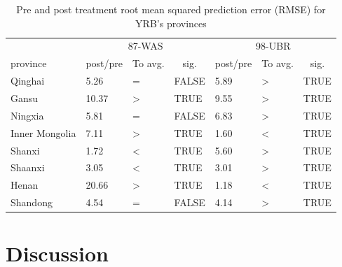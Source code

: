 \documentclass[preprint, 12pt]{elsarticle}
\providecommand{\DIFaddbegin}{} %
\providecommand{\DIFaddend}{} %
\begin{document}
\begin{table}[!htbp]\footnotesize
	\centering
	\caption{Pre and post treatment root mean squared prediction error (RMSE) for YRB's provinces}\label{tab:DSC_summary}
	\begin{tabularx}{0.8\textwidth}{XXXXXXX}
	  \toprule
			& \multicolumn{3}{c}{87-WAS} & \multicolumn{3}{c}{98-UBR} \\
  \cmidrule{2-7}    province  & \multicolumn{1}{c}{post/pre} & To avg. & \multicolumn{1}{c}{sig.} & \multicolumn{1}{c}{post/pre} & To avg.   & \multicolumn{1}{c}{sig.} \\
	  \midrule
	  Qinghai & 5.26  & =     & FALSE & 5.89  & >     & TRUE \\
	  Gansu & 10.37  & >     & TRUE  & 9.55  & >     & TRUE \\
	  Ningxia & 5.81  & =     & FALSE & 6.83  & >     & TRUE \\
	  Inner Mongolia & 7.11  & >     & TRUE  & 1.60  & <     & TRUE \\
	  Shanxi & 1.72  & <     & TRUE  & 5.60  & >     & TRUE \\
	  Shaanxi & 3.05  & <     & TRUE  & 3.01  & >     & TRUE \\
	  Henan & 20.66  & >     & TRUE  & 1.18  & <     & TRUE \\
	  Shandong & 4.54  & =     & FALSE & 4.14  & >     & TRUE \\
	  \bottomrule
	  \end{tabularx}%
	\label{tab:addlabel}%
\end{table}%
\DIFaddbegin



\DIFaddend \section{Discussion}\label{sec:discussion}
\end{document}

